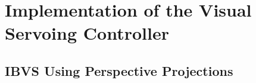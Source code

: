 
\chapter{Implementation of the Visual Servoing Controller}
\label{chap:implementation}

\section{IBVS Using Perspective Projections}
\label{sec:implementation-perspective}